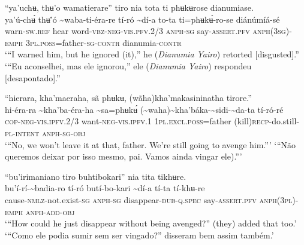 \documentclass[output=paper,
modfonts,nonflat
]{langsci/langscibook}
\begin{document}
\largerpage
\ea “ya'uchʉ, thʉ'o wamatierare” tiro nia tota ti phʉkʉrose dianumiase. \\[.3em]
\gll ya'ú-chʉ́	thʉ'́ó	{\textasciitilde}waba-ti-éra-re	tí-ró	{\textasciitilde}dí-a 	to-ta{\footnotemark} ti=phʉkʉ́-ro-se	diánúmíá-sé\\
     warn-\textsc{sw.ref}	hear	word\textsc{-vbz-neg-vis.pfv.}2/3	\textsc{anph-sg}	say-\textsc{assert.pfv}	\textsc{anph(3sg)-emph} 3\textsc{pl.poss}=father\textsc{-sg-contr}	dianumia-\textsc{contr}\\
\glt ‘“I warned him, but he ignored (it),” he (\textit{Dianumia Yairo}) retorted [disgusted].”
\newpage 
\glt ‘“Eu aconselhei, mas ele ignorou,” ele (\textit{Dianumia Yairo}) respondeu [desapontado].”
\z 

\ea “hierara, kha'maeraha, sã phʉkʉ, (wãha)kha'makasininatha tirore.” \\[.3em]
\gll hi-éra-ra	{\textasciitilde}kha'ba-éra-ha	{\textasciitilde}sa=phʉkʉ́ ({\textasciitilde}waha){\textasciitilde}kha'báka{\footnotemark}-{\textasciitilde}sidi-{\textasciitilde}da-ta	tí-ró-ré\\
     \textsc{cop-neg-vis.ipfv.}2/3	want\textsc{-neg-vis.ipfv.}1	1\textsc{pl.excl.poss}=father (kill)\textsc{recp}-do.still-\textsc{pl-intent}	\textsc{anph-sg}\textsc{-obj}\\
\glt ‘“No, we won’t leave it at that, father. We're still going to avenge him.”’
\glt ‘“Não queremos deixar por isso mesmo, pai. Vamos ainda vingar ele).”’
\z 


\ea “bu'irimaniano tiro buhtibokari” nia tita tikhʉre. \\[.3em]
\gll bu'í-rí-{\textasciitilde}badia-ro	tí-ró	butí-bo-kari	{\textasciitilde}dí-a	tí-ta	tí-khʉ-re \\
     cause-\textsc{nmlz-}not.exist\textsc{-sg}	\textsc{anph-sg}	disappear-\textsc{dub-q.spec}	say-\textsc{assert.pfv}	\textsc{anph(3pl)-emph}	\textsc{anph-add-obj}\\
\glt ‘“How could he just disappear without being avenged?” (they) added that too.’
\glt ‘“Como ele podia sumir sem ser vingado?” disseram bem assim também.’
\z 
\end{document}
